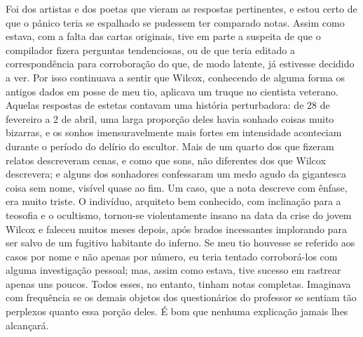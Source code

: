Foi dos artistas e dos poetas que vieram as respostas pertinentes, e
estou certo de que o pânico teria se espalhado se pudessem ter
comparado notas. Assim como estava, com a falta das cartas originais,
tive em parte a suspeita de que o compilador fizera perguntas
tendenciosas, ou de que teria editado a correspondência para
corroboração do que, de modo latente, já estivesse decidido a ver. Por
isso continuava a sentir que Wilcox, conhecendo de alguma forma os
antigos dados em posse de meu tio, aplicava um truque no cientista
veterano. Aquelas respostas de estetas contavam uma história
perturbadora: de 28 de fevereiro a 2 de abril, uma larga proporção deles
havia sonhado coisas muito bizarras, e os sonhos imensuravelmente mais
fortes em intensidade aconteciam durante o período do delírio do
escultor. Mais de um quarto dos que fizeram relatos descreveram cenas, e
como que sons, não diferentes dos que Wilcox descrevera; e alguns dos
sonhadores confessaram um medo agudo da gigantesca coisa sem nome,
visível quase ao fim. Um caso, que a nota descreve com ênfase, era muito
triste. O indivíduo, arquiteto bem conhecido, com inclinação para a
teosofia e o ocultismo, tornou-se violentamente insano na data da crise
do jovem Wilcox e faleceu muitos meses depois, após brados incessantes
implorando para ser salvo de um fugitivo habitante do inferno. Se meu
tio houvesse se referido aos casos por nome e não apenas por
número, eu teria tentado corroborá-los com alguma investigação pessoal;
mas, assim como estava, tive sucesso em rastrear apenas uns poucos. Todos
esses, no entanto, tinham notas completas. Imaginava com frequência se
os demais objetos dos questionários do professor se sentiam tão
perplexos quanto essa porção deles. É bom que nenhuma explicação jamais
lhes alcançará.

